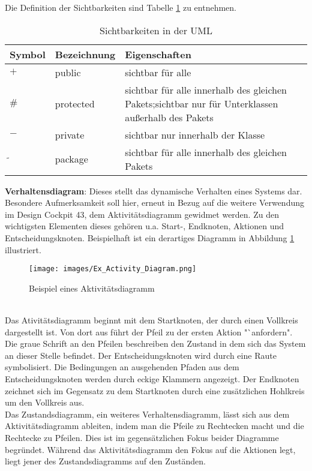 Die Definition der Sichtbarkeiten sind Tabelle \ref{tab:VisUML} zu entnehmen.
\begin{table}[H]	
\begin{tabularx}{\textwidth}{p{}|p{}|p{}}
	Symbol & Bezeichnung & Eigenschaften \\ \hline
	$+$ & public & sichtbar für alle \\ \hline
	$\#$ & protected & sichtbar für alle innerhalb des gleichen Pakets;\newline sichtbar nur für Unterklassen außerhalb des Pakets \\ \hline
	$-$ & private & sichtbar nur innerhalb der Klasse \\ \hline
	$\tilde{}$ & package & sichtbar für alle innerhalb des gleichen Pakets	
\end{tabularx}
\caption{Sichtbarkeiten in der UML}
\label{tab:VisUML}
\end{table} 

\textbf{Verhaltensdiagram}: Dieses stellt das dynamische Verhalten eines Systems dar. Besondere Aufmerksamkeit soll hier, erneut in Bezug auf die weitere Verwendung im Design Cockpit 43\textsuperscript{\textregistered}, dem Aktivitätsdiagramm gewidmet werden. Zu den wichtigsten Elementen dieses gehören u.a. Start-, Endknoten, Aktionen und Entscheidungsknoten. Beispielhaft ist ein derartiges Diagramm in Abbildung \ref{img:Ex_Activity_Diagram} illustriert. 
 \begin{figure}
	\centering
	\texttt{[image: images/Ex\_Activity\_Diagram.png]}
	\caption{Beispiel eines Aktivitätsdiagramm \cite{RBF16}} 
	\label{img:Ex_Activity_Diagram}
\end{figure}\\
Das Ativitätsdiagramm beginnt mit dem Startknoten, der durch einen Vollkreis dargestellt ist. Von dort aus führt der Pfeil zu der ersten Aktion "`anfordern". Die graue Schrift an den Pfeilen beschreiben den Zustand in dem sich das System an dieser Stelle befindet. Der Entscheidungsknoten wird durch eine Raute symbolisiert. Die Bedingungen an ausgehenden Pfaden aus dem Entscheidungsknoten werden durch eckige Klammern angezeigt. Der Endknoten zeichnet sich im Gegensatz zu dem Startknoten durch eine zusätzlichen Hohlkreis um den Vollkreis aus.\\
Das Zustandsdiagramm, ein weiteres Verhaltensdiagramm, lässt sich aus dem Aktivitätsdiagramm ableiten, indem man die Pfeile zu Rechtecken macht und die Rechtecke zu Pfeilen. Dies ist im gegensätzlichen Fokus beider Diagramme begründet. Während das Aktivitätsdiagramm den Fokus auf die Aktionen legt, liegt jener des Zustandsdiagramms auf den Zuständen.\\

